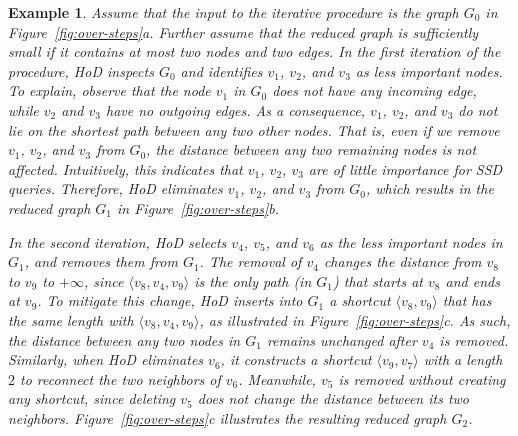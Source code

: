 \documentclass{sig-alternate}
\newtheorem{example} {Example}
\def\vgap{\vspace{0mm}}
\begin{document}
\begin{sloppy}


\vgap

\begin{example} \label{example:over-steps}
\em Assume that the input to the iterative procedure is the graph $G_0$ in Figure~\ref{fig:over-steps}a. Further assume that the reduced graph is sufficiently small if it contains at most two nodes and two edges. In the first iteration of the procedure, HoD inspects $G_0$ and identifies $v_1$, $v_2$, and $v_3$ as less important nodes. To explain, observe that the node $v_1$ in $G_0$ does not have any incoming edge, while $v_2$ and $v_3$ have no outgoing edges. As a consequence, $v_1$, $v_2$, and $v_3$ do not lie on the shortest path between any two other nodes. That is, even if we remove $v_1$, $v_2$, and $v_3$ from $G_0$, the distance between any two remaining nodes is not affected. Intuitively, this indicates that $v_1$, $v_2$, $v_3$ are of little importance for SSD queries. Therefore, HoD eliminates $v_1$, $v_2$, and $v_3$ from $G_0$, which results in the reduced graph $G_1$ in Figure~\ref{fig:over-steps}b.

\vgap

In the second iteration, HoD selects $v_4$, $v_5$, and $v_6$ as the less important nodes in $G_1$, and removes them from $G_1$. The removal of $v_4$ changes the distance from $v_8$ to $v_9$ to $+\infty$, since $\langle v_8, v_4, v_9\rangle$ is the only path (in $G_1$) that starts at $v_8$ and ends at $v_9$. To mitigate this change, HoD inserts into $G_1$ a shortcut $\langle v_8, v_9\rangle$ that has the same length with $\langle v_8, v_4, v_9\rangle$, as illustrated in Figure~\ref{fig:over-steps}c. As such, the distance between any two nodes in $G_1$ remains unchanged after $v_4$ is removed. Similarly, when HoD eliminates $v_6$, it constructs a shortcut $\langle v_9, v_7\rangle$ with a length $2$ to reconnect the two neighbors of $v_6$. Meanwhile, $v_5$ is removed without creating any shortcut, since deleting $v_5$ does not change the distance between its two neighbors. Figure~\ref{fig:over-steps}c illustrates the resulting reduced graph $G_2$.


\end{example}
\end{sloppy}
\end{document}
